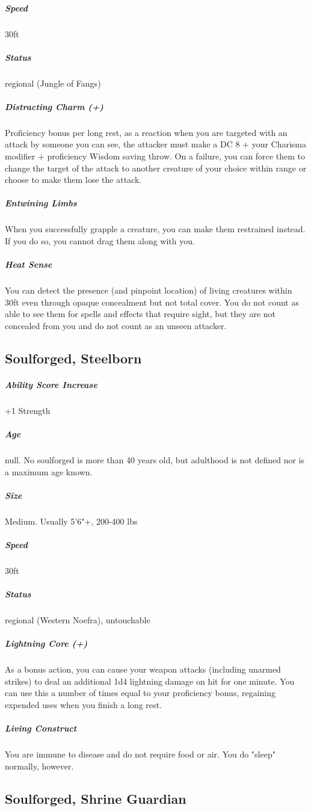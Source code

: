 \subparagraph*{Speed}  30ft

\subparagraph*{Status}  regional (Jungle of Fangs)

\subparagraph*{Distracting Charm (+)}  Proficiency bonus per long rest, as a reaction when you are targeted with an attack by someone you can see, the attacker must make a DC 8 + your Charisma modifier + proficiency Wisdom saving throw. On a failure, you can force them to change the target of the attack to another creature of your choice within range or choose to make them lose the attack.

\subparagraph*{Entwining Limbs}  When you successfully grapple a creature, you can make them restrained instead. If you do so, you cannot drag them along with you.

\subparagraph*{Heat Sense}  You can detect the presence (and pinpoint location) of living creatures within 30ft even through opaque concealment but not total cover. You do not count as able to see them for spells and effects that require sight, but they are not concealed from you and do not count as an unseen attacker.

\subsection{Soulforged, Steelborn} \label{lineage:steelborn}

\subparagraph*{Ability Score Increase}  +1 Strength

\subparagraph*{Age}  null. No soulforged is more than 40 years old, but adulthood is not defined nor is a maximum age known.

\subparagraph*{Size}  Medium. Usually 5'6"+, 200-400 lbs

\subparagraph*{Speed}  30ft
\subparagraph*{Status}  regional (Western Noefra), untouchable

\subparagraph*{Lightning Core (+)}  As a bonus action, you can cause your weapon attacks (including unarmed strikes) to deal an additional 1d4 lightning damage on hit for one minute. You can use this a number of times equal to your proficiency bonus, regaining expended uses when you finish a long rest.

\subparagraph*{Living Construct}  You are immune to disease and do not require food or air. You do "sleep" normally, however.

\subsection{Soulforged, Shrine Guardian} \label{lineage:shrine-guardian}

